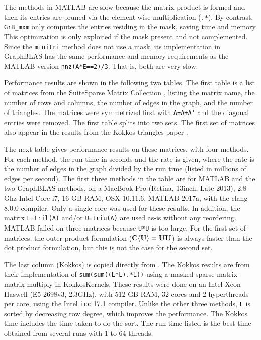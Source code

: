 \documentclass[12pt]{article}
\begin{document}
The methods in MATLAB are slow because the matrix product is formed and then
its entries are pruned via the element-wise multiplication (\verb'.*').  By
contrast, \verb'GrB_mxm' only computes the entries residing in the mask, saving
time and memory.  This optimization is only exploited if the mask present and
not complemented.  Since the \verb'minitri' method does not use a mask, its
implementation in GraphBLAS has the same performance and memory requirements as
the MATLAB version \verb'nnz(A*E==2)/3'.  That is, both are very slow.

Performance results are shown in the following two tables.  The first table is
a list of matrices from the SuiteSparse Matrix Collection \cite{DavisHu11},
listing the matrix name, the number of rows and columns, the number of edges in
the graph, and the number of triangles.  The matrices were symmetrized first
with \verb"A=A+A'" and the diagonal entries were removed.  The first table
splits into two sets.  The first set of matrices also appear in the results
from the Kokkos triangles paper \cite{WolfDeveciBerryHammondRajamanickam17}.

The next table gives performance results on these matrices, with four methods.
For each method, the run time in seconds and the rate is given, where the rate
is the number of edges in the graph divided by the run time (listed in millions
of edges per second).  The first three methods in the table are for MATLAB and
the two GraphBLAS methods, on a MacBook Pro (Retina, 13inch, Late 2013), 2.8
Ghz Intel Core i7, 16 GB RAM, OSX 10.11.6, MATLAB 2017a, with the clang 8.0.0
compiler.  Only a single core was used for these results.  In addition, the
matrix \verb'L=tril(A)' and/or \verb'U=triu(A)' are used as-is without any
reordering.  MATLAB failed on three matrices because \verb'U*U' is too large.
For the first set of matrices, the outer product formulation (${\bf C \langle U
\rangle} = {\bf UU}$) is always faster than the dot product formulation, but
this is not the case for the second set.

The last column (Kokkos) is copied directly from
\cite{WolfDeveciBerryHammondRajamanickam17}.  The Kokkos results are from their
implementation of \verb"sum(sum((L*L).*L))" using a masked sparse matrix-matrix
multiply in KokkosKernels.  These results were done on an Intel Xeon Haswell
(E5-2698v3, 2.3GHz), with 512 GB RAM, 32 cores and 2 hyperthreads per core,
using the Intel \verb'icc' 17.1 compiler.  Unlike the other three methods,
\verb'L' is sorted by decreasing row degree, which improves the performance.
The Kokkos time includes the time taken to do the sort.  The run time listed is
the best time obtained from several runs with 1 to 64 threads.
\end{document}
